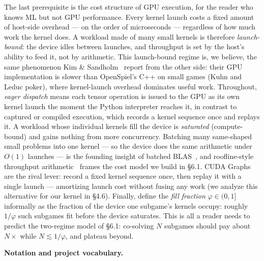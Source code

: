 \documentclass[11pt]{article}
\begin{document}
The last prerequisite is the cost structure of GPU execution, for the reader who knows
ML but not GPU performance. Every kernel launch costs a fixed amount of host-side
overhead --- on the order of microseconds --- regardless of how much work the kernel
does. A workload made of many small kernels is therefore \emph{launch-bound}: the device
idles between launches, and throughput is set by the host's ability to feed it, not by
arithmetic. This launch-bound regime is, we believe, the same phenomenon Kim \&
Sandholm~\citep{KimSandholm2026} report from the other side: their GPU
implementation is slower than OpenSpiel's C++ on small games (Kuhn and Leduc poker),
where kernel-launch overhead dominates useful work. Throughout, \emph{eager dispatch}
means each tensor operation is issued to the GPU as its own kernel launch the moment the
Python interpreter reaches it, in contrast to captured or compiled execution, which
records a kernel sequence once and replays it. A workload whose individual kernels fill
the device is \emph{saturated}
(compute-bound) and gains nothing from more concurrency. Batching many same-shaped small
problems into one kernel --- so the device does the same arithmetic under $O(1)$
launches --- is the founding insight of batched
BLAS~\citep{Abdelfattah2016,Abdelfattah2021}, and roofline-style throughput
arithmetic~\citep{Williams2009} frames the cost model we build in \S6.1. CUDA
Graphs~\citep{CUDAGraphs} are the rival lever: record a fixed kernel sequence once, then
replay it with a single launch --- amortizing launch cost without fusing any work (we
analyze this alternative for our kernel in \S4.6). Finally, define the \emph{fill
fraction} $\varphi \in (0, 1]$ informally as the fraction of the device one subgame's
kernels occupy: roughly $1/\varphi$ such subgames fit before the device saturates. This
is all a reader needs to predict the two-regime model of \S6.1: co-solving $N$ subgames
should pay about $N\times$ while $N \lesssim 1/\varphi$, and plateau beyond.

\textbf{Notation and project vocabulary.}
\end{document}
